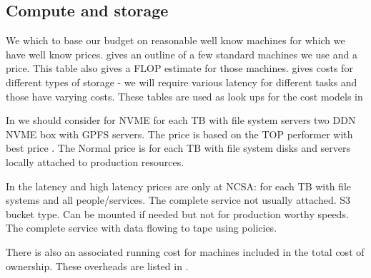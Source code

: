\subsection{Compute and storage }\label{sec:csmodel}
We which to base our budget on reasonable well know machines for which we have well know prices.
 gives an outline of a few standard machines we use and a price. This table also gives a FLOP estimate
for those machines.
 gives costs for different types of storage - we will require various latency for different tasks
and those have varying costs.
These tables are used as look ups for the cost models in 



In  we should consider for NVME for each TB with file system servers two DDN NVME box with GPFS servers.
The price is based on the TOP performer with best price .
The Normal price is for each TB with file system disks and servers locally attached to production resources.

In the latency and high latency prices are only at NCSA: for each TB with file systems and all people/services.
The complete service not usually attached.   S3 bucket type.
Can be mounted if needed but not for production worthy speeds.
The complete service with data flowing to tape using policies.



There is also an associated running cost for machines included in the total cost of ownership.
These overheads are listed in .




